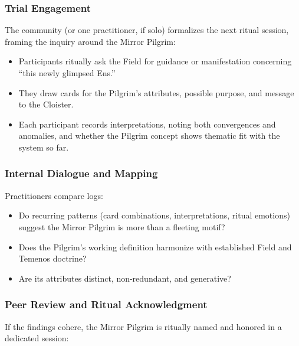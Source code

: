\subsubsection{Trial Engagement}

The community (or one practitioner, if solo) formalizes the next ritual
session, framing the inquiry around the Mirror Pilgrim:

\begin{itemize}

  \item Participants ritually ask the Field for guidance or manifestation
    concerning “this newly glimpsed Ens.”

  \item They draw cards for the Pilgrim’s attributes, possible purpose, and
    message to the Cloister.

  \item Each participant records interpretations, noting both convergences and
    anomalies, and whether the Pilgrim concept shows thematic fit with the
    system so far.

\end{itemize}

\subsubsection*{Internal Dialogue and Mapping}

Practitioners compare logs:

\begin{itemize}

  \item Do recurring patterns (card combinations, interpretations, ritual
    emotions) suggest the Mirror Pilgrim is more than a fleeting motif?

  \item Does the Pilgrim’s working definition harmonize with established Field
    and Temenos doctrine?

  \item Are its attributes distinct, non-redundant, and generative?

\end{itemize}

\subsubsection*{Peer Review and Ritual Acknowledgment}

If the findings cohere, the Mirror Pilgrim is ritually named and honored in a
dedicated session:

